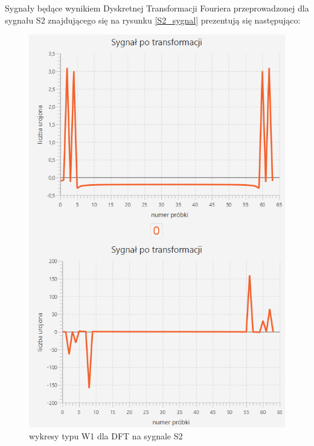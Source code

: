 \documentclass[12pt]{article}
\begin{document}
Sygnały będące wynikiem Dyskretnej Transformacji Fouriera przeprowadzonej dla sygnału S2 znajdującego się na rysunku \ref{S2_sygnal} prezentują się następująco:
\begin{figure}[H]
	\centering
	\includegraphics[width=\linewidth]{S2_DFT_W1.png}
	\caption{wykresy typu W1 dla DFT na sygnale S2}
	\label{S2_DFT_W1}
\end{figure}
\end{document}

